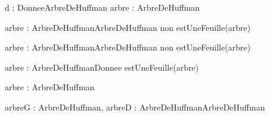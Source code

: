 \begin{algorithme}
        {d : Donnee}{ArbreDeHuffman}
        {}
    {arbre : ArbreDeHuffman}{\booleen}
    {}
    
    {arbre : ArbreDeHuffman}{ArbreDeHuffman}
    {non estUneFeuille(arbre)}

    {arbre : ArbreDeHuffman}{ArbreDeHuffman}
    {non estUneFeuille(arbre)}

    {arbre : ArbreDeHuffman}{Donnee}
    {estUneFeuille(arbre)}

    {arbre : ArbreDeHuffman}{\naturelNonNul}
    {}

    {arbreG : ArbreDeHuffman, arbreD : ArbreDeHuffman}{ArbreDeHuffman}
    {}
\end{algorithme}
